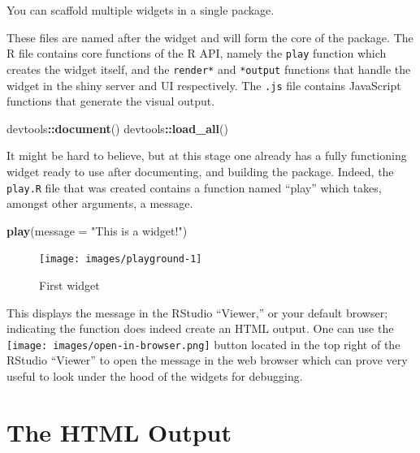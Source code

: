 \documentclass[10pt,]{krantz}
\makeatletter
\newenvironment{Shaded}{\begin{snugshade}}{\end{snugshade}}
\newcommand{\DataTypeTok}[1]{\textcolor[rgb]{0.27,0.27,0.27}{#1}}
\newcommand{\KeywordTok}[1]{\textcolor[rgb]{0.27,0.27,0.27}{\textbf{#1}}}
\newcommand{\NormalTok}[1]{#1}
\newcommand{\OperatorTok}[1]{\textcolor[rgb]{0.43,0.43,0.43}{\textbf{#1}}}
\newcommand{\StringTok}[1]{\textcolor[rgb]{0.5,0.5,0.5}{#1}}
\newenvironment{kframe}{%
\medskip{}
\setlength{\fboxsep}{.8em}
 \def\at@end@of@kframe{}%
 \ifinner\ifhmode%
  \def\at@end@of@kframe{\end{minipage}}%
  \begin{minipage}{\columnwidth}%
 \fi\fi%
 \def\FrameCommand##1{\hskip\@totalleftmargin \hskip-\fboxsep
 \colorbox{shadecolor}{##1}\hskip-\fboxsep
     \hskip-\linewidth \hskip-\@totalleftmargin \hskip\columnwidth}%
 \MakeFramed {\advance\hsize-\width
   \@totalleftmargin\z@ \linewidth\hsize
   \@setminipage}}%
 {\par\unskip\endMakeFramed%
 \at@end@of@kframe}
\renewenvironment{Shaded}{\begin{kframe}}{\end{kframe}}
\newenvironment{rmdblock}[1]
  {
  \begin{itemize}
  \renewcommand{\labelitemi}{
    \raisebox{-.7\height}[0pt][0pt]{
      {\setkeys{Gin}{width=3em,keepaspectratio}\texttt{[image: images/\#1]}}
    }
  }
  \setlength{\fboxsep}{1em}
  \begin{kframe}
  \item
  }
  {
  \end{kframe}
  \end{itemize}
  }
\newenvironment{rmdnote}
  {\begin{rmdblock}{note}}
  {\end{rmdblock}}
\makeatother
\begin{document}
\begin{rmdnote}
You can scaffold multiple widgets in a single package.
\end{rmdnote}

These files are named after the widget and will form the core of the package. The R file contains core functions of the R API, namely the \texttt{play} function which creates the widget itself, and the \texttt{render*} and \texttt{*output} functions that handle the widget in the shiny server and UI respectively. The \texttt{.js} file contains JavaScript functions that generate the visual output.

\begin{Shaded}
\begin{Highlighting}[]
\NormalTok{devtools}\OperatorTok{::}\KeywordTok{document}\NormalTok{()}
\NormalTok{devtools}\OperatorTok{::}\KeywordTok{load_all}\NormalTok{()}
\end{Highlighting}
\end{Shaded}

It might be hard to believe, but at this stage one already has a fully functioning widget ready to use after documenting, and building the package. Indeed, the \texttt{play.R} file that was created contains a function named ``play'' which takes, amongst other arguments, a message.

\begin{Shaded}
\begin{Highlighting}[]
\KeywordTok{play}\NormalTok{(}\DataTypeTok{message =} \StringTok{"This is a widget!"}\NormalTok{)}
\end{Highlighting}
\end{Shaded}

\begin{figure}[H]

{\centering \texttt{[image: images/playground-1]} 

}

\caption{First widget}\label{fig:playground-1}
\end{figure}

This displays the message in the RStudio ``Viewer,'' or your default browser; indicating the function does indeed create an HTML output. One can use the \texttt{[image: images/open-in-browser.png]} button located in the top right of the RStudio ``Viewer'' to open the message in the web browser which can prove very useful to look under the hood of the widgets for debugging.

\hypertarget{widgets-first-htmloutput}{%
\section{The HTML Output}\label{widgets-first-htmloutput}}
\end{document}

